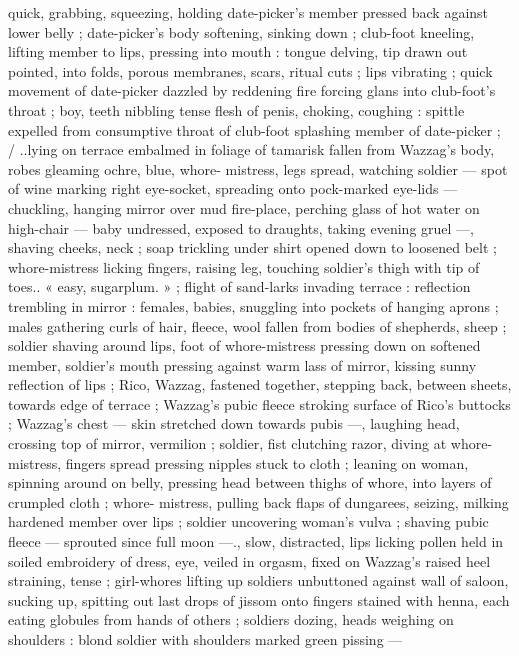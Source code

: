 quick, grabbing, squeezing, holding date-picker’s member pressed
back against lower belly ; date-picker’s body softening, sinking down
; club-foot kneeling, lifting member to lips, pressing into mouth :
tongue delving, tip drawn out pointed, into folds, porous membranes,
scars, ritual cuts ; lips vibrating ; quick movement of date-picker
dazzled by reddening fire forcing glans into club-foot's throat ; boy,
teeth nibbling tense flesh of penis, choking, coughing : spittle
expelled from consumptive throat of club-foot splashing member of
date-picker ; / ..lying on terrace embalmed in foliage of tamarisk
fallen from Wazzag's body, robes gleaming ochre, blue, whore-
mistress, legs spread, watching soldier --- spot of wine marking right
eye-socket, spreading onto pock-marked eye-lids --- chuckling,
hanging mirror over mud fire-place, perching glass of hot water on
high-chair --- baby undressed, exposed to draughts, taking evening
gruel ---, shaving cheeks, neck ; soap trickling under shirt opened
down to loosened belt ; whore-mistress licking fingers, raising leg,
touching soldier's thigh with tip of toes.. « easy, sugarplum. » ; flight
of sand-larks invading terrace : reflection trembling in mirror :
females, babies, snuggling into pockets of hanging aprons ; males
gathering curls of hair, fleece, wool fallen from bodies of shepherds,
sheep ; soldier shaving around lips, foot of whore-mistress pressing
down on softened member, soldier's mouth pressing against warm
lass of mirror, kissing sunny reflection of lips ; Rico, Wazzag,
fastened together, stepping back, between sheets, towards edge of
terrace ; Wazzag's pubic fleece stroking surface of Rico's buttocks ;
Wazzag's chest --- skin stretched down towards pubis ---, laughing
head, crossing top of mirror, vermilion ; soldier, fist clutching razor,
diving at whore-mistress, fingers spread pressing nipples stuck to
cloth ; leaning on woman, spinning around on belly, pressing head
between thighs of whore, into layers of crumpled cloth ; whore-
mistress, pulling back flaps of dungarees, seizing, milking hardened
member over lips ; soldier uncovering woman's vulva ; shaving pubic
fleece --- sprouted since full moon ---., slow, distracted, lips licking
pollen held in soiled embroidery of dress, eye, veiled in orgasm,
fixed on Wazzag's raised heel straining, tense ; girl-whores lifting up
soldiers unbuttoned against wall of saloon, sucking up, spitting out
last drops of jissom onto fingers stained with henna, each eating
globules from hands of others ; soldiers dozing, heads weighing on
shoulders : blond soldier with shoulders marked green pissing ---
